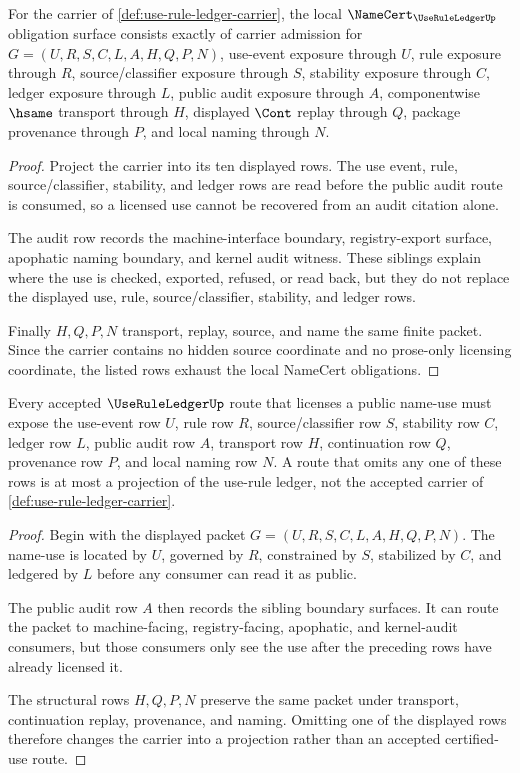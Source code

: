 \begin{theorem}
\label{thm:use-rule-ledger-namecert-obligations}
For the carrier of \autoref{def:use-rule-ledger-carrier}, the local $\NameCert_{\UseRuleLedgerUp}$ obligation surface consists exactly of carrier admission for $G=(U,R,S,C,L,A,H,Q,P,N)$, use-event exposure through $U$, rule exposure through $R$, source/classifier exposure through $S$, stability exposure through $C$, ledger exposure through $L$, public audit exposure through $A$, componentwise $\hsame$ transport through $H$, displayed $\Cont$ replay through $Q$, package provenance through $P$, and local naming through $N$.
\end{theorem}
\begin{proof}
Project the carrier into its ten displayed rows. The use event, rule, source/classifier, stability, and ledger rows are read before the public audit route is consumed, so a licensed use cannot be recovered from an audit citation alone.

The audit row records the machine-interface boundary, registry-export surface, apophatic naming boundary, and kernel audit witness. These siblings explain where the use is checked, exported, refused, or read back, but they do not replace the displayed use, rule, source/classifier, stability, and ledger rows.

Finally $H,Q,P,N$ transport, replay, source, and name the same finite packet. Since the carrier contains no hidden source coordinate and no prose-only licensing coordinate, the listed rows exhaust the local NameCert obligations.
\end{proof}

\begin{theorem}
\label{thm:use-rule-ledger-certified-use-route}
Every accepted $\UseRuleLedgerUp$ route that licenses a public name-use must expose the use-event row $U$, rule row $R$, source/classifier row $S$, stability row $C$, ledger row $L$, public audit row $A$, transport row $H$, continuation row $Q$, provenance row $P$, and local naming row $N$. A route that omits any one of these rows is at most a projection of the use-rule ledger, not the accepted carrier of \autoref{def:use-rule-ledger-carrier}.
\end{theorem}
\begin{proof}
Begin with the displayed packet $G=(U,R,S,C,L,A,H,Q,P,N)$. The name-use is located by $U$, governed by $R$, constrained by $S$, stabilized by $C$, and ledgered by $L$ before any consumer can read it as public.

The public audit row $A$ then records the sibling boundary surfaces. It can route the packet to machine-facing, registry-facing, apophatic, and kernel-audit consumers, but those consumers only see the use after the preceding rows have already licensed it.

The structural rows $H,Q,P,N$ preserve the same packet under transport, continuation replay, provenance, and naming. Omitting one of the displayed rows therefore changes the carrier into a projection rather than an accepted certified-use route.
\end{proof}

